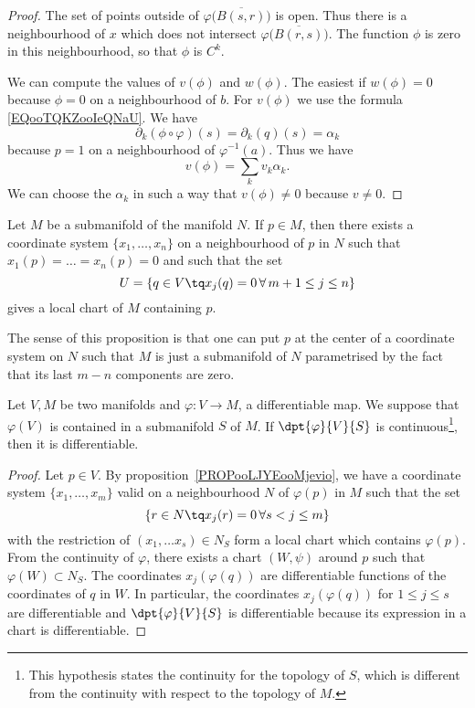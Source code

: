 \begin{proof}
	The set of points outside of \( \varphi\big( \overline{ B(s,r) } \big)\) is open. Thus there is a neighbourhood of \( x\) which does not intersect \( \varphi\big( \overline{ B(r,s) } \big)\). The function \( \phi\) is zero in this neighbourhood, so that \( \phi\) is \(  C^k\).

	We can compute the values of \( v(\phi)\) and \( w(\phi)\). The easiest if \( w(\phi)=0\) because \( \phi=0\) on a neighbourhood of \( b\). For \( v(\phi)\) we use the formula \ref{EQooTQKZooIeQNaU}. We have
	\begin{equation}
		\partial_k(\phi\circ\varphi)(s)=\partial_k(q)(s)=\alpha_k
	\end{equation}
	because \( p=1\) on a neighbourhood of \( \varphi^{-1}(a)\). Thus we have
	\begin{equation}
		v(\phi)=\sum_kv_k\alpha_k.
	\end{equation}
	We can choose the \( \alpha_k\) in such a way that \( v(\phi)\neq 0\) because \( v\neq 0\).
\end{proof}

\begin{proposition}       \label{PROPooLJYEooMjevio}
	Let $M$ be a submanifold of the manifold $N$. If $p\in M$, then there  exists a coordinate system $\{x_1,\ldots,x_n\}$ on a neighbourhood of $p$ in $N$ such that $x_1(p)=\ldots=x_n(p)=0$ and such that the set
	\[
		U=\{q\in V\tq x_j(q)=0\,\forall\, m+1\leq j\leq n\}
	\]
	gives a local chart of $M$ containing $p$.
\end{proposition}

The sense of this proposition is that one can put $p$ at the center of a coordinate system on $N$ such that $M$ is just a submanifold of $N$ parametrised by the fact that its last $m-n$ components are zero.

\begin{lemma}\label{lem:var_cont_diff}
	Let $V,M$ be two manifolds and $\varphi\colon V\to M$, a differentiable map. We suppose that $\varphi(V)$ is contained in a submanifold $S$ of $M$. If $\dpt{\varphi}{V}{S}$ is continuous\footnote{This hypothesis states the continuity for the topology of \( S\), which is different from the continuity with respect to the topology of \( M\).}, then it is differentiable.
\end{lemma}

\begin{proof}
	Let $p\in V$. By proposition~\ref{PROPooLJYEooMjevio}, we have  a coordinate system $\{x_1,\ldots,x_m\}$ valid on a neighbourhood $N$ of $\varphi(p)$ in $M$ such that the set
	\[
		\{r\in N\tq x_j(r)=0\, \forall s<j\leq m  \}
	\]
	with the restriction of $(x_1,\ldots x_s)\in N_S$ form a local chart which contains $\varphi(p)$. From the continuity of $\varphi$, there exists a chart $(W,\psi)$ around $p$ such that $\varphi(W)\subset N_S$. The coordinates $x_j(\varphi(q))$ are differentiable functions of  the coordinates of $q$ in $W$. In particular, the coordinates $x_j(\varphi(q))$ for $1\leq j\leq s$ are differentiable and $\dpt{\varphi}{V}{S}$ is differentiable because its expression in a chart is differentiable.
\end{proof}


